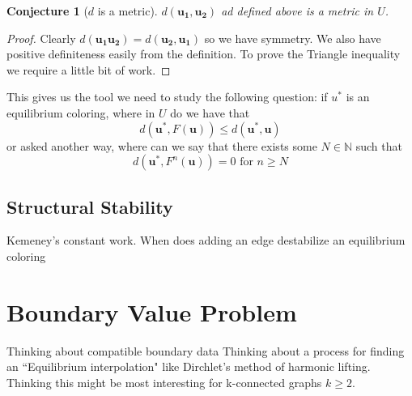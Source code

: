 \documentclass[]{article}
\newtheorem{conjecture}[theorem]{Conjecture}
\begin{document}
\begin{conjecture}[$d$ is a metric]
	$d(\mathbf{u_1},\mathbf{u_2})$ ad defined above is a metric in $U$. 
\end{conjecture}

\begin{proof}
	Clearly $d(\mathbf{u_1}\mathbf{u_2})=d(\mathbf{u_2},\mathbf{u_1})$ so we have symmetry. We also have positive definiteness easily from the definition. To prove the Triangle inequality we require a little bit of work. 
\end{proof}

This gives us the tool we need to study the following question: if $u^*$ is an equilibrium coloring, where in $U$ do we have that 
\begin{equation}
	d(\mathbf{u^*},F(\mathbf{u}))\leq d(\mathbf{u^*},\mathbf{u})
\end{equation}
or asked another way, where can we say that there exists some $N\in \mathbb{N}$ such that 
\begin{equation}
	d(\mathbf{u^*},F^n(\mathbf{u}))=0 \text{ for } n\geq N
\end{equation}
\subsection{Structural Stability}
Kemeney's constant work. When does adding an edge destabilize an equilibrium coloring
\section{Boundary Value Problem}

Thinking about compatible boundary data
Thinking about a process for finding an ``Equilibrium interpolation" like Dirchlet's method of harmonic lifting. 
Thinking this might be most interesting for k-connected graphs $k\geq 2$. 
\end{document}
